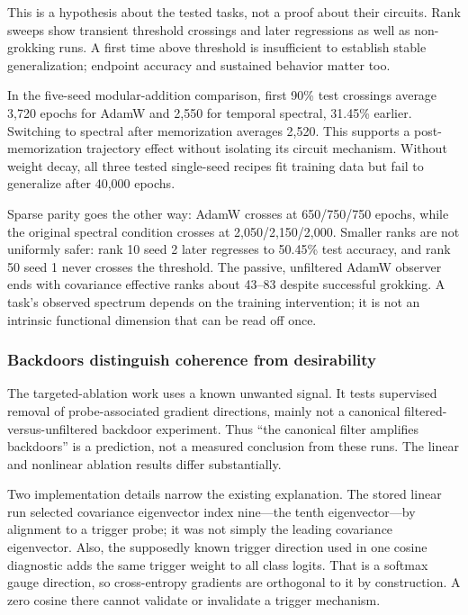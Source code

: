 \documentclass[
  british,
  10pt,
  a4paper,
]{article}
\begin{document}
This is a hypothesis about the tested tasks, not a proof about their
circuits. Rank sweeps show transient threshold crossings and later
regressions as well as non-\allowbreak{}grokking runs. A first time
above threshold is insufficient to establish stable generalization;
endpoint accuracy and sustained behavior matter too.

In the five-seed modular-\allowbreak{}addition comparison,\allowbreak{}
first 90\% test crossings average 3,720 epochs for AdamW and 2,550 for
temporal spectral, 31.45\% earlier. Switching to spectral after
memorization averages 2,520. This supports a
post-\allowbreak{}memorization\allowbreak{} trajectory effect without
isolating its circuit mechanism. Without weight decay, all three tested
single-\allowbreak{}seed recipes fit training data but fail to
generalize after 40,000 epochs.

Sparse parity goes the other way: AdamW crosses at
650/\allowbreak{}750/\allowbreak{}750 epochs, while the original
spectral condition crosses at
2,\allowbreak{}050/\allowbreak{}2,\allowbreak{}150/\allowbreak{}2,\allowbreak{}000.\allowbreak{}
Smaller ranks are not uniformly safer: rank 10 seed 2 later regresses to
50.45\% test accuracy, and rank 50 seed 1 never crosses the threshold.
The passive, unfiltered AdamW observer ends with covariance effective
ranks about 43--83 despite successful grokking. A task's observed
spectrum depends on the training intervention; it is not an intrinsic
functional dimension that can be read off once.

\subsubsection{Backdoors distinguish coherence from
desirability}\label{synthesis--backdoors-distinguish-coherence-from-desirability}

The targeted-\allowbreak{}ablation work uses a known unwanted signal. It
tests supervised removal of probe-\allowbreak{}associated gradient
directions,\allowbreak{} mainly not a canonical
filtered-\allowbreak{}versus-\allowbreak{}unfiltered backdoor
experiment.\allowbreak{} Thus ``the canonical filter amplifies
backdoors'' is a prediction,\allowbreak{} not a measured conclusion from
these runs. The linear and nonlinear ablation results differ
substantiall\allowbreak{}y.\allowbreak{}

Two implementation details narrow the existing explanation.\allowbreak{}
The stored linear run selected covariance eigenvector index nine---the
tenth eigenvector---by alignment to a trigger probe; it was not simply
the leading covariance eigenvector.\allowbreak{} Also, the supposedly
known trigger direction used in one cosine diagnostic adds the same
trigger weight to all class logits. That is a softmax gauge direction,
so cross-\allowbreak{}entropy gradients are orthogonal to it by
construction\allowbreak{}.\allowbreak{} A zero cosine there cannot
validate or invalidate a trigger mechanism.
\end{document}
